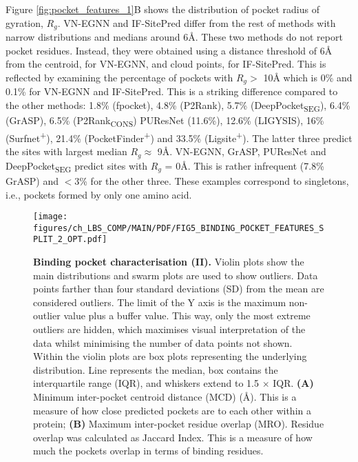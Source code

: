 Figure \ref{fig:pocket_features_1}B shows the distribution of pocket radius of gyration, $R_{g}$. VN-EGNN and IF-SitePred differ from the rest of methods with narrow distributions and medians around 6\AA{}. These two methods do not report pocket residues. Instead, they were obtained using a distance threshold of 6\AA{} from the centroid, for VN-EGNN, and cloud points, for IF-SitePred. This is reflected by examining the percentage of pockets with $R_{g} >$ 10\AA{} which is 0\% and 0.1\% for VN-EGNN and IF-SitePred. This is a striking difference compared to the other methods: 1.8\% (fpocket), 4.8\% (P2Rank), 5.7\% (DeepPocket\textsubscript{SEG}), 6.4\% (GrASP), 6.5\% (P2Rank\textsubscript{CONS}) PUResNet (11.6\%), 12.6\% (LIGYSIS), 16\% (Surfnet\textsuperscript{+}), 21.4\% (PocketFinder\textsuperscript{+}) and 33.5\% (Ligsite\textsuperscript{+}). The latter three predict the sites with largest median $R_{g} \approx$ 9\AA{}. VN-EGNN, GrASP, PUResNet and DeepPocket\textsubscript{SEG} predict sites with $R_{g}$ = 0\AA{}. This is rather infrequent (7.8\% GrASP) and $<$3\% for the other three. These examples correspond to singletons, i.e., pockets formed by only one amino acid.

\begin{figure}[ht!]
    \centering
    \texttt{[image: figures/ch\_LBS\_COMP/MAIN/PDF/FIG5\_BINDING\_POCKET\_FEATURES\_SPLIT\_2\_OPT.pdf]}
    \caption[Binding pocket characterisation (II)]{\textbf{Binding pocket characterisation (II).} Violin plots show the main distributions and swarm plots are used to show outliers. Data points farther than four standard deviations (SD) from the mean are considered outliers. The limit of the Y axis is the maximum non-outlier value plus a buffer value. This way, only the most extreme outliers are hidden, which maximises visual interpretation of the data whilst minimising the number of data points not shown. Within the violin plots are box plots representing the underlying distribution. Line represents the median, box contains the interquartile range (IQR), and whiskers extend to 1.5 $\times$ IQR. \textbf{(A)} Minimum inter-pocket centroid distance (MCD) (\AA{}). This is a measure of how close predicted pockets are to each other within a protein; \textbf{(B)} Maximum inter-pocket residue overlap (MRO). Residue overlap was calculated as Jaccard Index. This is a measure of how much the pockets overlap in terms of binding residues.}
    \label{fig:pocket_features_2}
\end{figure}

